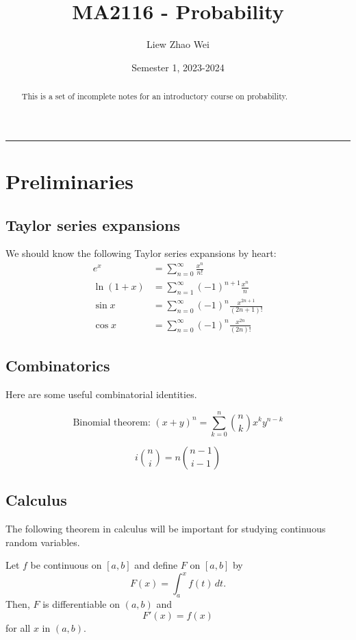 \documentclass{article}
\title{MA2116 - Probability}
\author{Liew Zhao Wei}
\date{Semester 1, 2023-2024}
\begin{document}
\maketitle

\begin{abstract}
  This is a set of incomplete notes for an introductory course on probability.
\end{abstract}

\hrule

\section{Preliminaries}

\subsection{Taylor series expansions}

We should know the following Taylor series expansions by heart:
\begin{align*}
  e^x        & = \sum\limits_{n = 0}^\infty \frac{x^n}{n!}
  \\
  \ln(1 + x) & = \sum\limits_{n = 1}^\infty (-1)^{n + 1} \frac{x^n}{n}
  \\
  \sin x     & = \sum\limits_{n = 0}^\infty (-1)^n \frac{x^{2n + 1}}{(2n + 1)!}
  \\
  \cos x     & = \sum\limits_{n = 0}^\infty (-1)^n \frac{x^{2n}}{(2n)!}
\end{align*}

\subsection{Combinatorics}

Here are some useful combinatorial identities.

\[
  \text{Binomial theorem: } (x + y)^n = \sum\limits_{k = 0}^n \binom{n}{k} x^k y^{n - k}
\]

\[
  i \binom{n}{i} = n \binom{n - 1}{i - 1}
\]

\subsection{Calculus}

The following theorem in calculus will be important for studying continuous random variables.

\begin{theorem}
  Let $f$ be continuous on $[a, b]$ and define $F$ on $[a, b]$ by
  \[
    F(x) = \int_a^x f(t) \, dt.
  \]
  Then, $F$ is differentiable on $(a, b)$ and
  \[
    F'(x) = f(x)
  \]
  for all $x$ in $(a, b)$.
\end{theorem}
\end{document}
